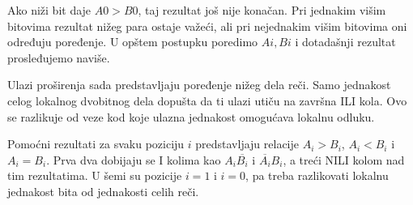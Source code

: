 Ako niži bit daje $A0>B0$, taj rezultat još nije konačan. Pri jednakim višim bitovima rezultat nižeg para ostaje važeći, ali pri nejednakim višim bitovima oni određuju poređenje. U opštem postupku poredimo $Ai,Bi$ i dotadašnji rezultat prosleđujemo naviše.

Ulazi proširenja sada predstavljaju poređenje nižeg dela reči. Samo jednakost celog lokalnog dvobitnog dela dopušta da ti ulazi utiču na završna ILI kola. Ovo se razlikuje od veze kod koje ulazna jednakost omogućava lokalnu odluku.

Pomoćni rezultati za svaku poziciju $i$ predstavljaju relacije $A_i>B_i$, $A_i<B_i$ i $A_i=B_i$. Prva dva dobijaju se I kolima kao $A_i\overline{B_i}$ i $\overline{A_i}B_i$, a treći NILI kolom nad tim rezultatima. U šemi su pozicije $i=1$ i $i=0$, pa treba razlikovati lokalnu jednakost bita od jednakosti celih reči.
